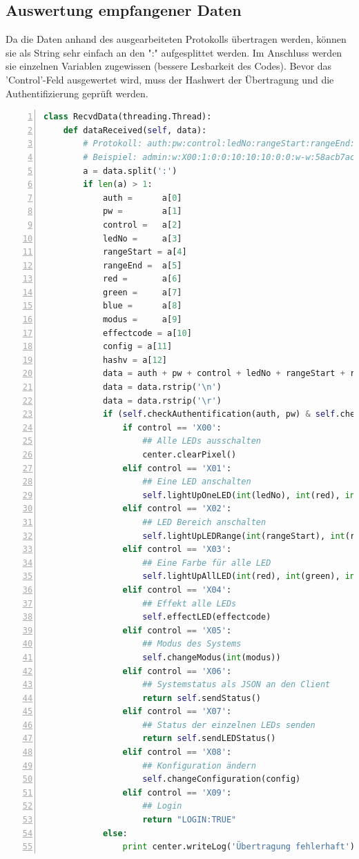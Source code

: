 \subsection{Auswertung empfangener Daten}
Da die Daten anhand des ausgearbeiteten Protokolls übertragen werden, können sie als String sehr einfach an den ":" aufgesplittet werden. Im Anschluss werden sie einzelnen Variablen zugewissen (bessere Lesbarkeit des Codes). Bevor das 'Control'-Feld ausgewertet wird, muss der Hashwert der Übertragung und die Authentifizierung geprüft werden. 

\begin{lstlisting}[caption=Auswertung der empfangenen Daten (RcvdData.py), language=python, frame=single, breaklines=true,columns=fullflexible, commentstyle=\color{gray}\upshape, captionpos=b, numbers = left]
class RecvdData(threading.Thread):
    def dataReceived(self, data):
        # Protokoll: auth:pw:control:ledNo:rangeStart:rangeEnd:red:green:blue:modus:effectcode:config:hashv
        # Beispiel: admin:w:X00:1:0:0:10:10:10:0:0:w-w:58acb7acccce58ffa8b953b12b5a7702bd42dae441c1ad85057fa70b
        a = data.split(':')
        if len(a) > 1:
            auth = 		a[0]
            pw = 		a[1]
            control = 	a[2]
            ledNo = 	a[3]
            rangeStart = a[4]
            rangeEnd = 	a[5]
            red = 		a[6]
            green = 	a[7]
            blue = 		a[8]
            modus = 	a[9]
            effectcode = a[10]
            config = a[11]
            hashv = a[12]
            data = auth + pw + control + ledNo + rangeStart + rangeEnd + red + green + blue + modus + effectcode + config
            data = data.rstrip('\n')
            data = data.rstrip('\r')
            if (self.checkAuthentification(auth, pw) & self.checkTransmissionData(data, hashv)):
                if control == 'X00':
                    ## Alle LEDs ausschalten
                    center.clearPixel()
                elif control == 'X01':
                    ## Eine LED anschalten
                    self.lightUpOneLED(int(ledNo), int(red), int(green), int(blue))
                elif control == 'X02':
                    ## LED Bereich anschalten
                    self.lightUpLEDRange(int(rangeStart), int(rangeEnd), int(red), int(green), int(blue))
                elif control == 'X03':
                    ## Eine Farbe für alle LED
                    self.lightUpAllLED(int(red), int(green), int(blue))
                elif control == 'X04':
                    ## Effekt alle LEDs
                    self.effectLED(effectcode)
                elif control == 'X05':
                    ## Modus des Systems
                    self.changeModus(int(modus))
                elif control == 'X06':
                    ## Systemstatus als JSON an den Client
                    return self.sendStatus()
                elif control == 'X07':
                    ## Status der einzelnen LEDs senden
                    return self.sendLEDStatus()
                elif control == 'X08':
                    ## Konfiguration ändern
                    self.changeConfiguration(config)
                elif control == 'X09':
                    ## Login
                    return "LOGIN:TRUE"
            else:
                print center.writeLog('Übertragung fehlerhaft')
\end{lstlisting}
